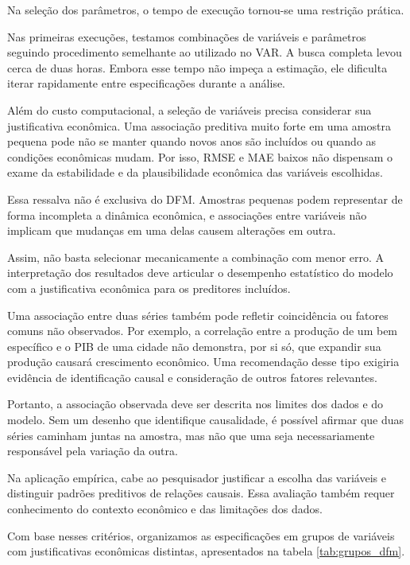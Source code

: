 Na seleção dos parâmetros, o tempo de execução tornou-se uma restrição prática.

Nas primeiras execuções, testamos combinações de variáveis e parâmetros seguindo procedimento semelhante ao utilizado no VAR. A busca completa levou cerca de duas horas. Embora esse tempo não impeça a estimação, ele dificulta iterar rapidamente entre especificações durante a análise.

Além do custo computacional, a seleção de variáveis precisa considerar sua justificativa econômica. Uma associação preditiva muito forte em uma amostra pequena pode não se manter quando novos anos são incluídos ou quando as condições econômicas mudam. Por isso, RMSE e MAE baixos não dispensam o exame da estabilidade e da plausibilidade econômica das variáveis escolhidas.

Essa ressalva não é exclusiva do DFM. Amostras pequenas podem representar de forma incompleta a dinâmica econômica, e associações entre variáveis não implicam que mudanças em uma delas causem alterações em outra.

Assim, não basta selecionar mecanicamente a combinação com menor erro. A interpretação dos resultados deve articular o desempenho estatístico do modelo com a justificativa econômica para os preditores incluídos.

Uma associação entre duas séries também pode refletir coincidência ou fatores comuns não observados. Por exemplo, a correlação entre a produção de um bem específico e o PIB de uma cidade não demonstra, por si só, que expandir sua produção causará crescimento econômico. Uma recomendação desse tipo exigiria evidência de identificação causal e consideração de outros fatores relevantes.

Portanto, a associação observada deve ser descrita nos limites dos dados e do modelo. Sem um desenho que identifique causalidade, é possível afirmar que duas séries caminham juntas na amostra, mas não que uma seja necessariamente responsável pela variação da outra.

Na aplicação empírica, cabe ao pesquisador justificar a escolha das variáveis e distinguir padrões preditivos de relações causais. Essa avaliação também requer conhecimento do contexto econômico e das limitações dos dados.

Com base nesses critérios, organizamos as especificações em grupos de variáveis com justificativas econômicas distintas, apresentados na tabela \ref{tab:grupos_dfm}.

